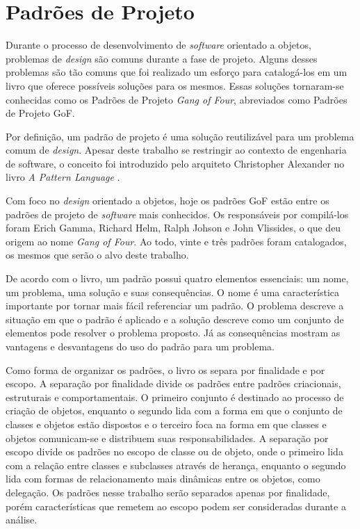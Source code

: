 \chapter{Padrões de Projeto}

Durante o processo de desenvolvimento de \textit{software} 
orientado a objetos, 
problemas de \textit{design} são comuns durante a 
fase de projeto. Alguns desses problemas 
são tão comuns que foi realizado um esforço para catalogá-los 
em um livro \cite{gamma:1995} que oferece possíveis 
soluções para os mesmos. 
Essas soluções tornaram-se conhecidas como 
os Padrões de Projeto \textit{Gang of Four}, abreviados 
como Padrões de Projeto GoF.

Por definição, um padrão de projeto é uma solução 
reutilizável para um problema comum de \textit{design}. Apesar 
deste trabalho se restringir ao contexto de engenharia 
de software, o conceito foi introduzido pelo arquiteto 
Christopher Alexander no livro \textit{A Pattern Language} 
\cite{alexanderpatternlanguage}.

Com foco no \textit{design} orientado a objetos, hoje os 
padrões GoF estão entre os padrões de 
projeto de \textit{software} mais conhecidos. Os responsáveis 
por compilá-los foram Erich Gamma, Richard Helm, 
Ralph Johson e John Vlissides, o que deu origem ao 
nome \textit{Gang of Four}. Ao todo, vinte e três 
padrões foram catalogados, os mesmos que serão o alvo 
deste trabalho.

De acordo com o livro, um padrão possui quatro elementos 
essenciais: um nome, um problema, uma solução e suas 
consequências. O nome é uma característica importante 
por tornar mais fácil referenciar um padrão. O problema 
descreve a situação em que o padrão é aplicado e 
a solução descreve como um conjunto de elementos pode 
resolver o problema proposto. Já as consequências 
mostram as vantagens e desvantagens do uso do padrão 
para um problema.

Como forma de organizar os padrões, o livro os separa 
por finalidade e por escopo. A separação por finalidade 
divide os padrões entre padrões criacionais, estruturais 
e comportamentais. O primeiro conjunto é destinado ao 
processo de criação de objetos, enquanto o segundo 
lida com a forma em que o conjunto de classes e objetos 
estão dispostos e o terceiro foca na forma em que classes 
e objetos comunicam-se e distribuem suas responsabilidades. 
A separação por 
escopo divide os padrões no escopo de classe ou de objeto, 
onde o primeiro lida com a relação entre classes e 
subclasses através de herança, enquanto o segundo lida 
com formas de relacionamento mais dinâmicas entre os 
objetos, como delegação. Os padrões nesse trabalho 
serão separados apenas por finalidade, porém 
características que remetem ao escopo 
podem ser consideradas durante a análise.


